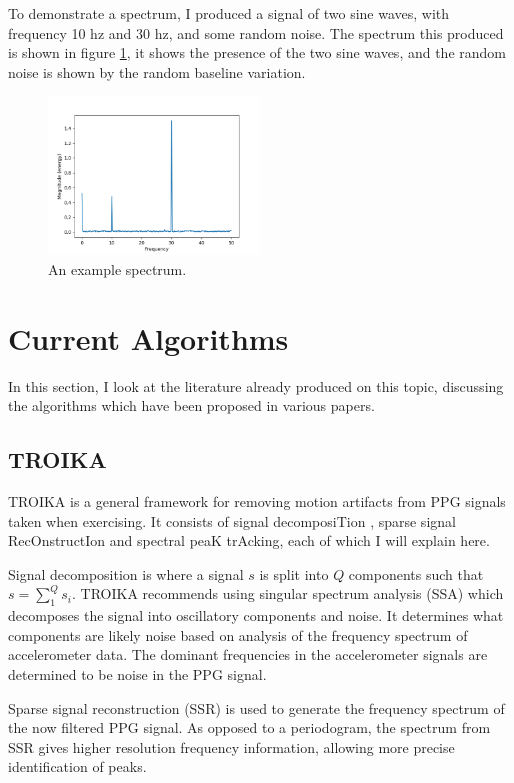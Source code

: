 \documentclass[12pt,a4paper,twoside,openany]{report}
\begin{document}
To demonstrate a spectrum, I produced a signal of two sine waves, with
frequency 10 hz
and 30 hz, and some random noise. The spectrum this produced is shown in 
figure \ref{fig:example-spectrum}, it shows the presence of the two sine
waves, and the random noise is shown by the random baseline variation.

\begin{figure}[h]
	\centering
	\includegraphics[width=0.5\textwidth]{figs/example-spectrum.png}
	\caption{An example spectrum.}
	\label{fig:example-spectrum}
\end{figure}



\section{Current Algorithms}

In this section, I look at the literature already produced on this topic,
discussing the algorithms which have been proposed in various papers.

\subsection{TROIKA}

TROIKA \cite{Zhang15} is a general framework for removing motion artifacts
from PPG signals taken when exercising. It consists of signal decomposiTion
, sparse signal RecOnstructIon and spectral peaK trAcking, each of which I will
explain here.

Signal decomposition is where a signal \(s\) is split into \(Q\) components
such that $s=\sum_1^Q s_i$. TROIKA recommends using singular spectrum analysis
(SSA) which decomposes the signal into oscillatory components and noise. It
determines what components are likely noise based on analysis of the frequency
spectrum of accelerometer data. The dominant frequencies in the accelerometer
signals are determined to be noise in the PPG signal.

Sparse signal reconstruction (SSR) is used to generate the frequency spectrum of the
now filtered PPG signal. As opposed to a periodogram, the spectrum from SSR
gives higher resolution frequency information, allowing more precise
identification of peaks.
\end{document}
